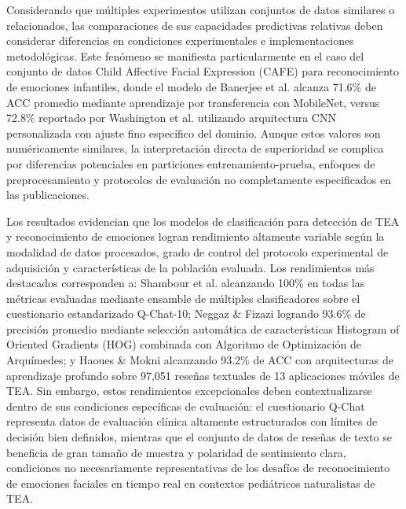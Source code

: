 \documentclass{ieeeaccess}
\begin{document}
	Considerando que múltiples experimentos utilizan conjuntos de datos similares o relacionados, las comparaciones de sus capacidades predictivas relativas deben considerar diferencias en condiciones experimentales e implementaciones metodológicas. Este fenómeno se manifiesta particularmente en el caso del conjunto de datos Child Affective Facial Expression (CAFE) para reconocimiento de emociones infantiles, donde el modelo de Banerjee et al. \cite{b13} alcanza 71.6\% de ACC promedio mediante aprendizaje por transferencia con MobileNet, versus 72.8\% reportado por Washington et al. \cite{b7} utilizando arquitectura CNN personalizada con ajuste fino específico del dominio. Aunque estos valores son numéricamente similares, la interpretación directa de superioridad se complica por diferencias potenciales en particiones entrenamiento-prueba, enfoques de preprocesamiento y protocolos de evaluación no completamente especificados en las publicaciones.
	
	Los resultados evidencian que los modelos de clasificación para detección de TEA y reconocimiento de emociones logran rendimiento altamente variable según la modalidad de datos procesados, grado de control del protocolo experimental de adquisición y características de la población evaluada. Los rendimientos más destacados corresponden a: Shambour et al. \cite{b10} alcanzando 100\% en todas las métricas evaluadas mediante ensamble de múltiples clasificadores sobre el cuestionario estandarizado Q-Chat-10; Neggaz \& Fizazi \cite{b20} logrando 93.6\% de precisión promedio mediante selección automática de características Histogram of Oriented Gradients (HOG) combinada con Algoritmo de Optimización de Arquímedes; y Haoues \& Mokni \cite{b11} alcanzando 93.2\% de ACC con arquitecturas de aprendizaje profundo sobre 97,051 reseñas textuales de 13 aplicaciones móviles de TEA. Sin embargo, estos rendimientos excepcionales deben contextualizarse dentro de sus condiciones específicas de evaluación: el cuestionario Q-Chat representa datos de evaluación clínica altamente estructurados con límites de decisión bien definidos, mientras que el conjunto de datos de reseñas de texto se beneficia de gran tamaño de muestra y polaridad de sentimiento clara, condiciones no necesariamente representativas de los desafíos de reconocimiento de emociones faciales en tiempo real en contextos pediátricos naturalistas de TEA.
	
\end{document}
